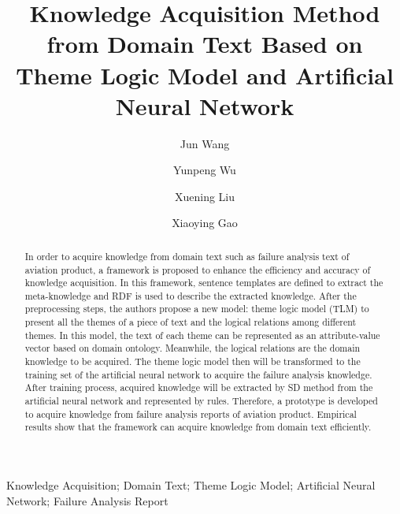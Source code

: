 \documentclass{elsarticle}
\begin{document}
\begin{frontmatter}


\title{Knowledge Acquisition Method from Domain Text Based on Theme Logic Model and Artificial Neural Network }


\author[buaa]{Jun Wang}
\author[buaa]{Yunpeng Wu}
\author[buaa]{Xuening Liu}
\author[buaa]{Xiaoying Gao}



\address[buaa]{School of Economics \& Management, Beihang University, Beijing 100083,
P.R. China }


\begin{abstract}
In order to acquire knowledge from domain text such as failure
analysis text of aviation product, a framework is proposed to enhance
the efficiency and accuracy of knowledge acquisition. In this
framework, sentence templates are defined to extract the
meta-knowledge and RDF is used to describe the extracted knowledge.
After the preprocessing steps, the authors propose a new model: theme logic
model (TLM) to present all the themes of a piece of text and the logical
relations among different themes. In this model, the text of each
theme can be represented as an attribute-value vector based on domain
ontology. Meanwhile, the logical relations are the domain knowledge to be
acquired. The theme logic model then will be transformed to the
training set of the artificial neural network to acquire the failure
analysis knowledge. After training process, acquired knowledge will be extracted by SD method from the artificial neural network and represented by rules. Therefore, a prototype is developed to acquire knowledge from failure analysis reports of aviation product. Empirical results show that the framework can acquire knowledge from domain text efficiently.
\end{abstract}

\begin{keyword}


Knowledge Acquisition; Domain Text; Theme Logic Model; Artificial Neural Network; Failure Analysis Report


\end{keyword}

\end{frontmatter}
\end{document}
